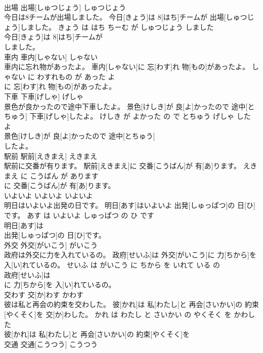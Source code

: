 \documentclass[8pt]{extreport}
\begin{document}
\begin{CJK}{UTF8}{min}
\\	出場	出場[しゅつじょう]	しゅつじょう	
\\	今日は8チームが出場しました。	今日[きょう]は 8[はち]チームが 出場[しゅつじょう]しました。	きょう は はち ちーむ が しゅつじょう しました	
\\	今日[きょう]は 8[はち]チームが
\\	しました。			
\\	車内	車内[しゃない]	しゃない	
\\	車内に忘れ物があったよ。	車内[しゃない]に 忘[わす]れ 物[もの]があったよ。	しゃない に わすれもの が あった よ	
\\	に 忘[わす]れ 物[もの]があったよ。			
\\	下車	下車[げしゃ]	げしゃ	
\\	景色が良かったので途中下車したよ。	景色[けしき]が 良[よ]かったので 途中[とちゅう] 下車[げしゃ]したよ。	けしき が よかった の で とちゅう げしゃ した よ	
\\	景色[けしき]が 良[よ]かったので 途中[とちゅう]
\\	したよ。			
\\	駅前	駅前[えきまえ]	えきまえ	
\\	駅前に交番が有ります。	駅前[えきまえ]に 交番[こうばん]が 有[あ]ります。	えきまえ に こうばん が あります	
\\	に 交番[こうばん]が 有[あ]ります。			
\\	いよいよ	いよいよ	いよいよ	
\\	明日はいよいよ出発の日です。	明日[あす]はいよいよ 出発[しゅっぱつ]の 日[ひ]です。	あす は いよいよ しゅっぱつ の ひ です	
\\	明日[あす]は
\\	出発[しゅっぱつ]の 日[ひ]です。			
\\	外交	外交[がいこう]	がいこう	
\\	政府は外交に力を入れているの。	政府[せいふ]は 外交[がいこう]に 力[ちから]を 入[い]れているの。	せいふ は がいこう に ちから を いれて いる の	
\\	政府[せいふ]は
\\	に 力[ちから]を 入[い]れているの。			
\\	交わす	交[か]わす	かわす	
\\	彼は私と再会の約束を交わした。	彼[かれ]は 私[わたし]と 再会[さいかい]の 約束[やくそく]を 交[か]わした。	かれ は わたし と さいかい の やくそく を かわした	
\\	彼[かれ]は 私[わたし]と 再会[さいかい]の 約束[やくそく]を
\\	交通	交通[こうつう]	こうつう	

\end{CJK}
\end{document}
